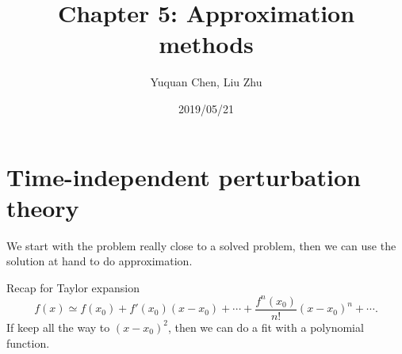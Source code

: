 \documentclass[UTF8,12pt]{article} %
\begin{document}
\title{Chapter 5: Approximation methods}
\author{Yuquan Chen, Liu Zhu}
\date{2019/05/21} %
\maketitle

\section{Time-independent perturbation theory}

We start with the problem really close to a solved problem, then we can use the solution at hand to do approximation. 

\begin{myboxes}{Recap for Taylor expansion}{}
\begin{equation}
   f(x)\simeq f(x_0)+f'(x_0)(x-x_0)+\cdots+\frac{f^n(x_0)}{n!}(x-x_0)^n+\cdots . 
\end{equation}
If keep all the way to $(x-x_0)^2$, then we can do a fit with a polynomial function.
\end{myboxes}
\end{document}
